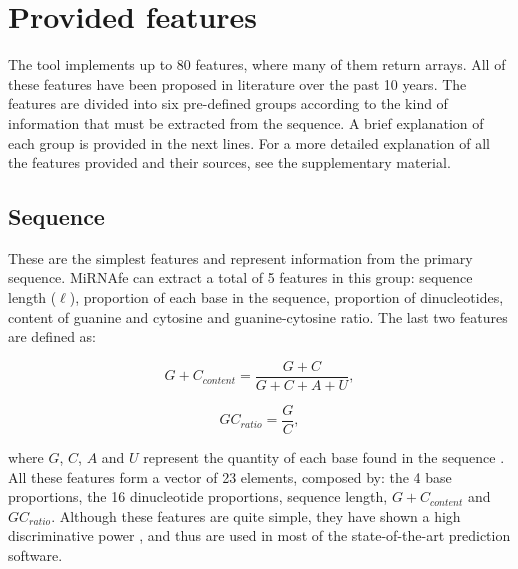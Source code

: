 \documentclass{article}
\begin{document}
\section{Provided features}

The tool implements up to 80 features, where many of them return arrays. All of these features have been proposed in literature over the past 10 years. The
features are divided into six pre-defined groups according to the kind of information that must be extracted from the sequence. A brief explanation of each
group is provided in the next lines. For a more detailed explanation of all the features provided and their sources, see the supplementary material.

\subsection{Sequence}
These are the simplest features and represent information from the primary sequence. MiRNAfe can extract a total of 5 features in this group: sequence length
($\ell$),  proportion of each base in the sequence, proportion of dinucleotides, content of guanine and cytosine and guanine-cytosine ratio. The last two
features are defined as:

\begin{equation} \label{eq:GCcontent}
 {G+C}_{content} = \frac{G+C}{G+C+A+U},
\end{equation}

\begin{equation} \label{eq:GCratio}
 {GC}_{ratio} = \frac{G}{C},
\end{equation}


\noindent where $G$, $C$, $A$ and $U$ represent the quantity of each base found in the sequence \citep{Hertel06}. All these features form a vector of 23
elements, composed by: the 4 base proportions, the 16 dinucleotide proportions, sequence length, ${G+C}_{content}$ and ${GC}_{ratio}$. Although these features
are quite simple, they have shown a high discriminative power \citep{Rukshan09}, and thus are used in most of the state-of-the-art prediction software.
\end{document}
